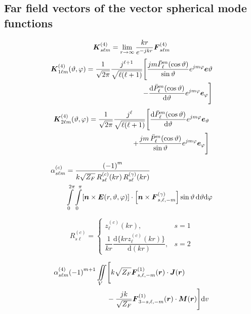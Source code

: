 \subsection{Far field vectors of the vector spherical mode functions}
\begin{equation*}
  \boldsymbol{K}_{s\ell m}^{(4)} = \lim\limits_{r\to\infty} \dfrac{kr}{e^{-jkr}} \boldsymbol{F}_{s\ell m}^{(4)}
\end{equation*}
\begin{align*}
  \boldsymbol{K}_{1\ell m}^{(4)}(\vartheta,\varphi) = \dfrac{1}{\sqrt{2\pi}} \dfrac{j^{\ell + 1}}{\sqrt{\ell (\ell + 1)}}
  \Bigg[\dfrac{jm \bar{P}_{\ell}^{m}(\cos \vartheta)}{\sin \vartheta}e^{jm\varphi}\boldsymbol{e}\vartheta\\
  - \dfrac{\mathrm{d}\bar{P}_{\ell}^{m}(\cos \vartheta)}{\mathrm{d}\vartheta} e^{jm\varphi}\boldsymbol{e}_{\varphi}\Bigg]\\
\end{align*}
\begin{align*}
  \boldsymbol{K}_{2\ell m}^{(4)}(\vartheta,\varphi) = \dfrac{1}{\sqrt{2\pi}} \dfrac{j^{\ell}}{\sqrt{\ell (\ell + 1)}}
  \Bigg[\dfrac{\mathrm{d}\bar{P}_{\ell}^{m}(\cos \vartheta)}{\mathrm{d}\vartheta} e^{jm\varphi}\boldsymbol{e}_{\vartheta}\\
  + \dfrac{jm\,\bar{P}_{\ell}^{m}(\cos \vartheta)}{\sin \vartheta}e^{jm\varphi}\boldsymbol{e}_{\varphi} \Bigg]\\
\end{align*}


\begin{align*}
  \alpha_{s\ell m}^{(c)} &= \dfrac{{(-1)}^{m}}{k\sqrt{Z_{F}}\,R_{s\ell}^{(c)}(kr) \, R_{s\ell}^{(\gamma)}(kr)}\\
  &\int\limits_{0}^{2\pi}\int\limits_{0}^{\pi} [\boldsymbol{n}\times\boldsymbol{E}(r,\vartheta,\varphi)]\cdot\left[\boldsymbol{n}\times\boldsymbol{F}_{s,\ell,-m}^{(\gamma)}\right] \sin\vartheta \,\mathrm{d}\vartheta\mathrm{d}\varphi
\end{align*}

\begin{equation*}
  R_{s\ell}^{(c)} =
  \begin{cases}
    z_{\ell}^{(c)}(kr), &s=1\\
    \dfrac{1}{kr} \dfrac{\mathrm{d}\{kr z_{\ell}^{(c)}(kr)\}}{\mathrm{d}(kr)}, &s=2
  \end{cases}
\end{equation*}

\begin{align*}
  \alpha_{s\ell m}^{(4)}{(-1)}^{m+1} \iint\limits_{V}&\Bigg[ k\sqrt{Z_{F}}\boldsymbol{F}_{s,\ell,-m}^{(1)}(\boldsymbol{r})\cdot\boldsymbol{J}(\boldsymbol{r})\\
  &- \dfrac{jk}{\sqrt{Z_{F}}} \boldsymbol{F}_{3-s,\ell,-m}^{(1)}(\boldsymbol{r})\cdot\boldsymbol{M}(\boldsymbol{r}) \Bigg]\text{d}v
\end{align*}

